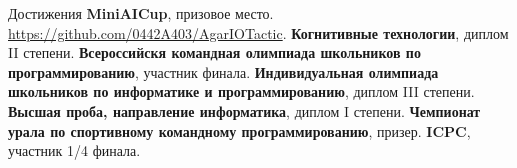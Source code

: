 \begin{rubric}{Достижения}
\entry*[2018]%
	\textbf{MiniAICup}, призовое место. \url{https://github.com/0442A403/AgarIOTactic}.
\entry*[2018]%
	\textbf{Когнитивные технологии}, диплом II степени.
\entry*[2018]%
	\textbf{Всероссийскя командная олимпиада школьников по программированию}, участник финала.
\entry*[2019]%
	\textbf{Индивидуальная олимпиада школьников по информатике и программированию}, диплом III степени.
\entry*[2019]%
	\textbf{Высшая проба, направление информатика}, диплом I степени.
\entry*[2019]%
	\textbf{Чемпионат урала по спортивному командному программированию}, призер.
\entry*[2020]%
	\textbf{ICPC}, участник 1/4 финала.
\end{rubric}